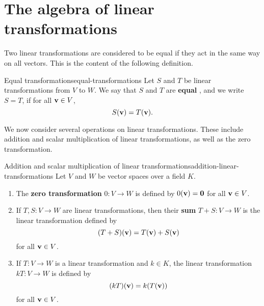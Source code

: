 \section{The algebra of linear transformations}

Two linear transformations are considered to be equal if they act in
the same way on all vectors. This is the content of the following
definition.

\begin{definition}{Equal transformations}{equal-transformations}
  Let $S$ and $T$ be linear transformations from $V$ to $W$. We say
  that $S$ and $T$ are \textbf{equal}%
  , and we write $S = T$, if
  for all $\mbox{\bf v}\in V$,
  \begin{equation*}
    S(\mbox{\bf v}) = T(\mbox{\bf v}).
  \end{equation*}
\end{definition}

We now consider several operations on linear transformations. These
include addition and scalar multiplication of linear transformations,
as well as the zero transformation.

\begin{definition}{Addition and scalar multiplication of linear transformations}{addition-linear-transformations}
  Let $V$ and $W$ be vector spaces over a field $K$.
  \begin{enumialphparenastyle}
    \begin{enumerate}
    \item The \textbf{zero transformation}%
       $0:V\to W$ is
      defined by $0(\mbox{\bf v})=\mbox{\bf 0}$ for all $\mbox{\bf v}\in V$.
    \item If $T,S:V\to W$ are linear transformations, then their
      \textbf{sum}%
      $T+S:V\to W$ is the linear transformation defined by
      \begin{equation*}
        (T+S)(\mbox{\bf v}) = T(\mbox{\bf v}) + S(\mbox{\bf v})
      \end{equation*}
      for all $\mbox{\bf v}\in V$.
    \item If $T:V\to W$ is a linear transformation and $k\in K$, the
      linear transformation%
      $kT : V\to W$ is defined by
      \begin{equation*}
        (kT)(\mbox{\bf v}) = k(T(\mbox{\bf v}))
      \end{equation*}
      for all $\mbox{\bf v}\in V$.
    \end{enumerate}
  \end{enumialphparenastyle}
\end{definition}

